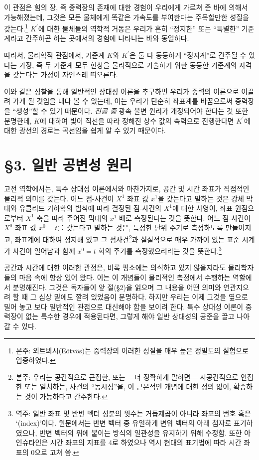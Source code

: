 \documentclass[b5paper]{article}
\begin{document}
이 관점은 힘의 장, 즉 중력장의 존재에 대한 경험이 우리에게 가르쳐 준 바에 의해서 가능해졌는데, 그것은 모든 물체에게 똑같은 가속도를 부여한다는 주목할만한 성질을 갖는다.\footnote{본주: 외트뵈시(E\"otv\"os)는 중력장의 이러한 성질을 매우 높은 정밀도의 실험으로 입증하였다.} $K^{\prime}$에 대한 물체들의 역학적 거동은 우리가 흔히 ``정지한'' 또는 ``특별한'' 기준계라고 간주하곤 하는 곳에서의 경험에 나타나는 바와 동일하다.

따라서, 물리학적 관점에서, 기준계 $ K $와 $ K^\prime $은 둘 다 동등하게 ``정지계''로 간주될 수 있다는 가정, 즉 두 기준계 모두 현상을 물리적으로 기술하기 위한 동등한 기준계의 자격을 갖는다는 가정이 자연스레 떠오른다.

이와 같은 성찰을 통해 일반적인 상대성 이론을 추구하면 우리가 중력의 이론으로 이끌려 가게 될 것임을 내다 볼 수 있는데, 이는 우리가 단순히 좌표계를 바꿈으로써 중력장을 ``생성''할 수 있기 때문이다. \emph{진공 중} 광속 불변 원리가 개정되어야 한다는 것 또한 분명한데, $K$에 대하여 빛이 직선을 따라 정해진 상수 값의 속력으로 진행한다면 $K^{\prime}$에 대한 광선의 경로는 곡선임을 쉽게 알 수 있기 때문이다. 

\section*{\S 3. 일반 공변성 원리}

고전 역학에서는, 특수 상대성 이론에서와 마찬가지로, 공간 및 시간 좌표가 직접적인 물리적 의미를 갖는다. 어느 점-사건이 $X^1$ 좌표 값 $x^1$을 갖는다고 말하는 것은 강체 막대와 유클리드 기하학의  법칙에 따라 결정된 점-사건의 $ X^1 $에 대한 사영이, 좌표 원점으로부터 $ X^1 $ 축을 따라 주어진 막대의 $ x^1 $ 배로 측정된다는 것을 뜻한다.  어느 점-사건이 $ X^0 $ 좌표 값 $ x^0=t $를 갖는다고 말하는 것은, 특정한 단위 주기로 측정하도록 만들어지고, 좌표계에 대하여 정지해 있고 그 점사건\footnote{본주: 우리는 공간적으로 근접한, 또는 ---더 정확하게 말하면--- 시공간적으로 인접한 또는 일치하는, 사건의 ``동시성''을, 이 근본적인 개념에 대한 정의 없이, 확증하는 것이 가능하다고 간주한다.}과 실질적으로 매우 가까이 있는 표준 시계가 사건이 일어남과 함께 $ x^0=t $ 회의 주기를 측정했으리라는 것을 뜻한다.\footnote{역주: 일반 좌표 및 반변 벡터 성분의 윗수는 거듭제곱이 아니라 좌표의 번호 혹은 `\ind{}(index)'이다. 원문에서는 반변 벡터 중 유일하게 변위 벡터의 \ind\를 아래 첨자로 표기하였으나, 반변 벡터의 \ind{}\를 위에 붙이는 방식의 일관성을 유지하기 위해 수정함. 또한 아인슈타인은 시간 좌표의 지표를 4로 하였으나 역시 현대의 표기법에 따라 시간 좌표의 \ind\는 0으로 고쳐 씀.}

공간과 시간에 대한 이러한 관점은, 비록 평소에는 의식하고 있지 않을지라도 물리학자들의 마음 속에 항상 있어 왔다. 이는 이 개념들이 물리적인 측정에서 수행하는 역할에서 분명해진다. 그것은 독자들이 앞 절(\S 2)을 읽으며 그 내용을 어떤 의미와 연관지으려 할 때 그 심상 밑에도 깔려 있었음이 분명하다. 하지만 우리는 이제 그것을 옆으로 밀어 놓고 보다 일반적인 관점으로 대신해야 함을 보이려 한다.  특수 상대성 이론이 중력장이 없는 특수한 경우에 적용된다면, 그렇게 해야 일반 상대성의 공준을 끌고 나아갈 수 있다.
\end{document}
